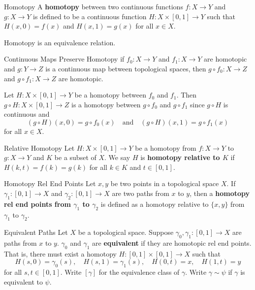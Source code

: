 \documentclass{report}
\begin{document}
\begin{definition}{Homotopy}{}
	A \textbf{homotopy} between two continuous functions $f:X\to Y$ and $g:X\to Y$ is defined to be a continuous function $H: X \times[0,1] \rightarrow Y$ such that $H(x, 0)=f(x)$ and $H(x, 1)=g(x)$ for all $x \in X$.
\end{definition}

Homotopy is an equivalence relation.
\begin{proposition}{Continuous Maps Preserve Homotopy}{}
	if $f_0:X\to Y$ and $f_1:X\to Y$ are homotopic and $g:Y\to Z$ is a continuous map between topological spaces, then $g\circ f_0:X\to Z$ and $g\circ f_1:X\to Z$ are homotopic.
\end{proposition}

\begin{prf}
	Let $H:X\times [0,1]\to Y$ be a homotopy between $f_0$ and $f_1$. Then $g\circ H:X\times [0,1]\to Z$ is a homotopy between $g\circ f_0$ and $g\circ f_1$ since $g\circ H$ is continuous and
	\[
		(g\circ H)(x,0)=g\circ f_0(x)\quad\text{and}\quad (g\circ H)(x,1)=g\circ f_1(x)
	\]
	for all $x\in X$.
\end{prf}

\begin{definition}{Relative Homotopy}{}
	Let $H: X \times[0,1] \rightarrow Y$ be a homotopy from $f:X\to Y$ to $g:X\to Y$ and $K$ be a subset of $X$. We say $H$ is \textbf{homotopy relative to $K$} if $H(k, t)=f(k)=g(k)$ for all $k \in K$ and $t \in[0,1]$.
\end{definition}

\begin{definition}{Homotopy Rel End Points}{}
	Let $x,y$ be two points in a topological space $X$. If $\gamma_1:[0,1]\to X$ and $\gamma_2:[0,1]\to X$ are two paths from $x$ to $y$, then a \textbf{homotopy rel end points from $\gamma_1$ to $\gamma_2$} is defined as a homotopy relative to $\{x, y\}$ from $\gamma_1$ to $\gamma_2$.
\end{definition}

\begin{definition}{Equivalent Paths}{}
	Let $X$ be a topological space. Suppose $\gamma_0,\gamma_1: [0,1] \longrightarrow X$ are paths from $x$ to $y$. $\gamma_0$ and $\gamma_1$ are \textbf{equivalent} if they are homotopic rel end points. That is, there must exist a homotopy $H: [0,1] \times [0,1] \longrightarrow X$ such that
	$$
		H(s, 0)=\gamma_0(s), \quad H(s, 1)=\gamma_1(s), \quad H(0, t)=x, \quad H(1, t)=y
	$$
	for all $s,t \in [0,1]$. Write $[\gamma]$ for the equivalence class of $\gamma$. Write $\gamma\sim \psi$ if $\gamma$ is equivalent to $\psi$.
\end{definition}
\end{document}
